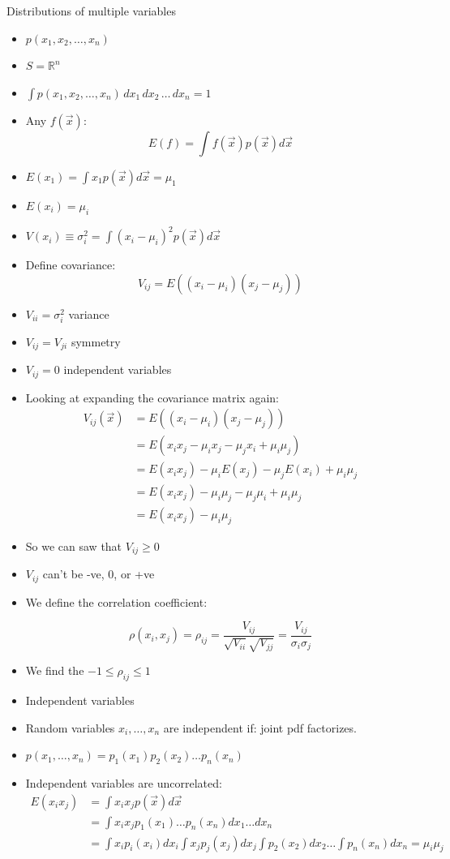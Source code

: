 Distributions of multiple variables
\begin{itemize}
    \item $p(x_1, x_2, \ldots, x_n) $
    \item $S = \mathbb{R}^n$
    \item $\int p(x_1, x_2, \ldots, x_n) \, dx_1 \, dx_2 \, \ldots \, dx_n = 1$
    \item Any $f(\vec{x})$:
    \[ E(f) = \int f(\vec{x}) p(\vec{x}) d \vec{x} \]
    \item $E(x_1) = \int x_1 p(\vec{x}) d \vec{x} = \mu_1$
    \item $E(x_i) = \mu_i$
    \item $V(x_i) \equiv \sigma_i^2 = \int (x_i - \mu_i)^2 p(\vec{x}) d \vec{x}$
    \item Define covariance:
    \[ V_{ij} = E((x_i - \mu_i)(x_j - \mu_j)) \]
    \item $V_{ii} = \sigma_i^2$ variance
    \item $V_{ij} = V_{ji}$ symmetry
    \item $V_{ij} = 0$ independent variables
    \item Looking at expanding the covariance matrix again:
    \begin{align*}
        V_{ij}(\vec{x}) &= E((x_i- \mu_i)(x_j - \mu_j)) \\
        &= E(x_i x_j - \mu_i x_j - \mu_j x_i + \mu_i \mu_j) \\
        &= E(x_i x_j) - \mu_i E(x_j) - \mu_j E(x_i) + \mu_i \mu_j \\
        &= E(x_i x_j) - \mu_i \mu_j - \mu_j \mu_i + \mu_i \mu_j \\
        &= E(x_i x_j) - \mu_i \mu_j
    \end{align*}
    \item So we can saw that $V_{ij} \ge 0$
    \item $V_{ij}$ can't be -ve, 0, or +ve
    \item We define the correlation coefficient:

    \[ \rho(x_i, x_j) = \rho_{ij} = \frac{V_{ij}}{\sqrt{V_{ii}} \sqrt{V_{jj}}} = \frac{V_{ij}}{\sigma_i \sigma_j} \]

    \item We find the $-1 \le \rho_{ij} \le 1$
    \item Independent variables
    \item Random variables $x_i, \dots, x_n$ are independent if: joint pdf factorizes.
    \item $p(x_1, \ldots, x_n) = p_1(x_1) p_2(x_2) \ldots p_n(x_n)$
    \item Independent variables are uncorrelated:
    \begin{align*}
        E(x_i x_j) &= \int x_i x_j p(\vec{x}) d \vec{x} \\
        &= \int x_i x_j p_1(x_1) \ldots p_n(x_n) dx_1 \ldots dx_n \\
        &= \int x_i p_i(x_i) dx_i \int x_j p_j(x_j) dx_j \int p_2(x_2) dx_2 \ldots \int p_n(x_n) dx_n = \mu_i \mu_j
    \end{align*}


\end{itemize}
